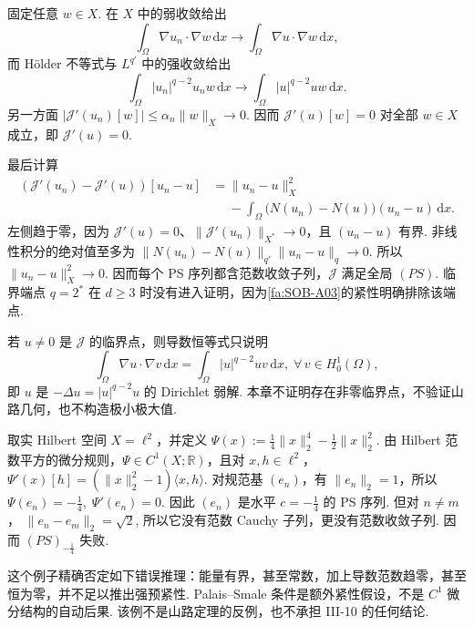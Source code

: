 固定任意 \(\displaystyle w\in X\). 在 \(\displaystyle X\) 中的弱收敛给出
\[
\int_\Omega\nabla u_n\mathbin{\cdot}\nabla w\,\mathrm{d}x
\longrightarrow
\int_\Omega\nabla u\mathbin{\cdot}\nabla w\,\mathrm{d}x,
\]
而 Hölder 不等式与 \(\displaystyle L^{q'}\) 中的强收敛给出
\[
\int_\Omega|u_n|^{q-2}u_nw\,\mathrm{d}x
\longrightarrow
\int_\Omega|u|^{q-2}uw\,\mathrm{d}x.
\]
另一方面 \(\displaystyle|\mathcal J'(u_n)[w]|\leqslant\alpha_n\|w\|_X\to0\). 因而 \(\displaystyle\mathcal J'(u)[w]=0\) 对全部 \(\displaystyle w\in X\) 成立，即 \(\displaystyle\mathcal J'(u)=0\).

最后计算
\[
\begin{aligned}
\displaystyle (\mathcal J'(u_n)-\mathcal J'(u))[u_n-u]
&=\displaystyle \|u_n-u\|_X^2\\
&\mathrel{\phantom{=}}-\displaystyle
\int_\Omega
\bigl(N(u_n)-N(u)\bigr)(u_n-u)\,\mathrm{d}x.
\end{aligned}
\]
左侧趋于零，因为 \(\displaystyle\mathcal J'(u)=0\)、\(\displaystyle\|\mathcal J'(u_n)\|_{X^*}\to0\)，且 \(\displaystyle(u_n-u)\) 有界. 非线性积分的绝对值至多为
\(\displaystyle \|N(u_n)-N(u)\|_{q'}\|u_n-u\|_q \longrightarrow0\).
所以 \(\displaystyle\|u_n-u\|_X^2\to0\). 因而每个 PS 序列都含范数收敛子列，\(\displaystyle\mathcal J\) 满足全局 \(\displaystyle(PS)\). 临界端点 \(\displaystyle q=2^*\) 在 \(\displaystyle d\geqslant3\) 时没有进入证明，因为\autoref{fa:SOB-A03}的紧性明确排除该端点.

若 \(\displaystyle u\neq0\) 是 \(\displaystyle\mathcal J\) 的临界点，则导数恒等式只说明
\[
\int_\Omega\nabla u\mathbin{\cdot}\nabla v\,\mathrm{d}x
=
\int_\Omega|u|^{q-2}uv\,\mathrm{d}x,
\;
\forall\,v\in H_0^1(\Omega),
\]
即 \(\displaystyle u\) 是 \(\displaystyle-\Delta u=|u|^{q-2}u\) 的 Dirichlet 弱解. 本章不证明存在非零临界点，不验证山路几何，也不构造极小极大值.

\begin{FACounterexample}[导数恒零仍可失去强预紧性]
取实 Hilbert 空间 \(\displaystyle X=\ell^2\)，并定义
\(\displaystyle \Psi(x):=\frac{1}{4}\|x\|_2^4-\frac{1}{2}\|x\|_2^2\).
由 Hilbert 范数平方的微分规则，\(\displaystyle\Psi\in C^1(X;\mathbb R)\)，且对 \(\displaystyle x,h\in\ell^2\)，
\(\displaystyle \Psi'(x)[h] = (\|x\|_2^2-1)\langle x,h\rangle\).
对规范基 \(\displaystyle(e_n)\)，有 \(\displaystyle\|e_n\|_2=1\)，所以
\(\displaystyle \Psi(e_n)=-\frac{1}{4}, \; \Psi'(e_n)=0\).
因此 \(\displaystyle(e_n)\) 是水平 \(\displaystyle c=-\frac{1}{4}\) 的 PS 序列. 但对 \(\displaystyle n\neq m\)，
\(\displaystyle \|e_n-e_m\|_2=\sqrt2\),
所以它没有范数 Cauchy 子列，更没有范数收敛子列. 因而 \(\displaystyle(PS)_{-\frac{1}{4}}\) 失败.

这个例子精确否定如下错误推理：能量有界，甚至常数，加上导数范数趋零，甚至恒为零，并不足以推出强预紧性. Palais--Smale 条件是额外紧性假设，不是 \(\displaystyle C^1\) 微分结构的自动后果. 该例不是山路定理的反例，也不承担 III-10 的任何结论.
\end{FACounterexample}

